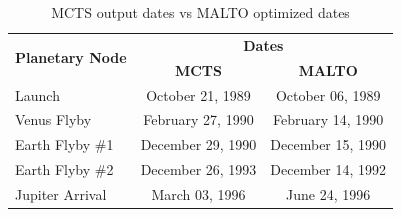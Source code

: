 \documentclass[letterpaper, preprint, paper,11pt]{AAS}	%
\begin{document}
\begin{table}[h!]
    \begin{center}
        \caption{MCTS output dates vs MALTO optimized dates}
        \label{table:galiMInputs}
        \begin{tabular}{lcc}
            \toprule
            \multirow{2}{*}{\textbf{Planetary Node}} & \multicolumn{2}{c}{\textbf{Dates}}\\
            \cmidrule{2-3}
            {} & \textbf{MCTS} & \textbf{MALTO}\\
            \midrule
            Launch          & October 21, 1989  & October 06, 1989\\
            Venus Flyby     & February 27, 1990 & February 14, 1990 \\ 
            Earth Flyby \#1 & December 29, 1990 & December 15, 1990 \\
            Earth Flyby \#2 & December 26, 1993 & December 14, 1992 \\
            Jupiter Arrival & March 03, 1996    & June 24, 1996 \\
            \bottomrule
        \end{tabular}
    \end{center}
\end{table}
\newpage
\end{document}
